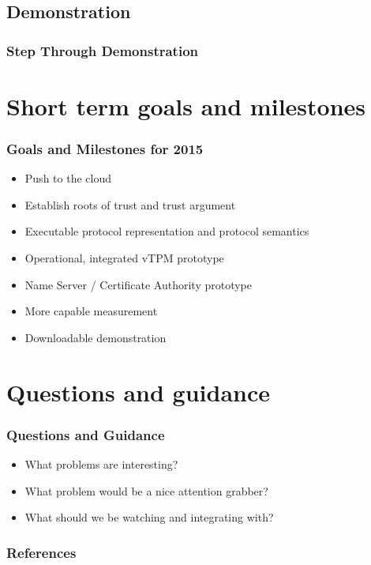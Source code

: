 \documentclass{beamer}
\begin{document}
\subsection{Demonstration}

\begin{frame}
  \frametitle{Step Through Demonstration}
\end{frame}

\section{Short term goals and milestones}

\begin{frame}
  \frametitle{Goals and Milestones for 2015}

  \begin{itemize}
  \item Push to the cloud
  \item Establish roots of trust and trust argument
  \item Executable protocol representation and protocol semantics
  \item Operational, integrated vTPM prototype
  \item Name Server / Certificate Authority prototype
  \item More capable measurement
  \item Downloadable demonstration
  \end{itemize}
\end{frame}

\section{Questions and guidance}

\begin{frame}
  \frametitle{Questions and Guidance}

  \begin{itemize}
  \item What problems are interesting?
  \item What problem would be a nice attention grabber?
  \item What should we be watching and integrating with?
  \end{itemize}
\end{frame}

\nocite{Coker::Principles-of-R,Haldar:04:Semantic-Remote,Fabrega:1999aa}

\begin{frame}
  \frametitle{References}
  
\end{frame}
\end{document}
